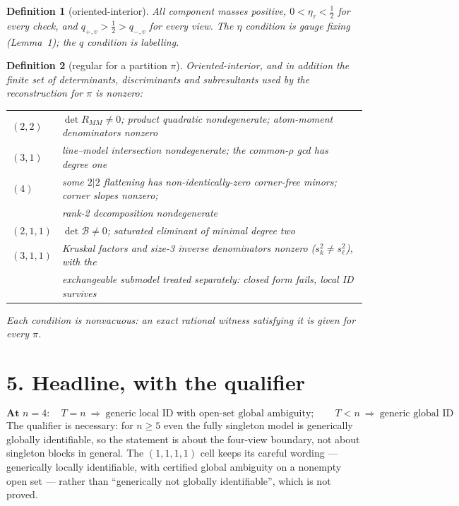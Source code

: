 \documentclass[11pt]{article}
\newtheorem{definition}{Definition}
\theoremstyle{remark}
\begin{document}
\begin{definition}[oriented-interior]
All component masses positive, $0<\eta_\tau<\tfrac12$ for every check, and $q_{+,v}>\tfrac12>q_{-,v}$ for every view. The $\eta$ condition is gauge fixing (Lemma~1); the $q$ condition is labelling.
\end{definition}

\begin{definition}[regular for a partition $\pi$]
Oriented-interior, and in addition the finite set of determinants, discriminants and subresultants used by the reconstruction for $\pi$ is nonzero:
\begin{center}\small
\begin{tabular}{@{}ll@{}}
\toprule
$(2,2)$ & $\det R_{MM}\neq0$; product quadratic nondegenerate; atom-moment denominators nonzero\\
$(3,1)$ & line--model intersection nondegenerate; the common-$\rho$ gcd has degree one\\
$(4)$ & some $2|2$ flattening has non-identically-zero corner-free minors; corner slopes nonzero;\\
 & rank-2 decomposition nondegenerate\\
$(2,1,1)$ & $\det\mathcal B\neq0$; saturated eliminant of minimal degree two\\
$(3,1,1)$ & Kruskal factors and size-3 inverse denominators nonzero ($s_k^2\neq s_\ell^2$), with the\\
 & exchangeable submodel treated separately: closed form fails, local ID survives\\
\bottomrule
\end{tabular}
\end{center}
Each condition is nonvacuous: an exact rational witness satisfying it is given for every $\pi$.
\end{definition}

\section*{5. Headline, with the qualifier}

\[
\boxed{\textbf{At }n=4:\quad T=n\ \Rightarrow\ \text{generic local ID with open-set global ambiguity};\qquad T<n\ \Rightarrow\ \text{generic global ID}}
\]
The qualifier is necessary: for $n\ge5$ even the fully singleton model is generically globally identifiable, so the statement is about the four-view boundary, not about singleton blocks in general. The $(1,1,1,1)$ cell keeps its careful wording --- generically locally identifiable, with certified global ambiguity on a nonempty open set --- rather than ``generically not globally identifiable'', which is not proved.
\end{document}
